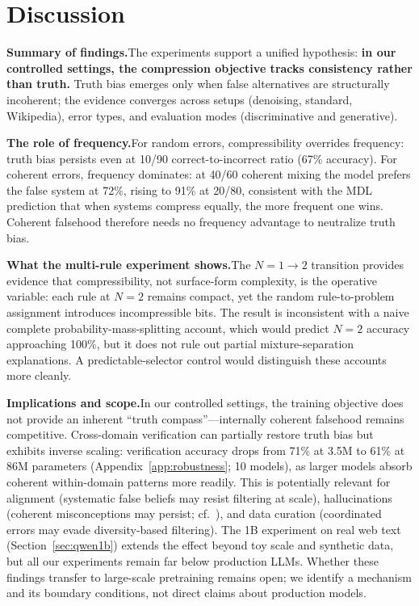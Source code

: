 \documentclass{article}
\begin{document}
\section{Discussion}
\label{sec:discussion}

\textbf{Summary of findings.}\quad The experiments support a unified hypothesis: \textbf{in our controlled settings, the compression objective tracks consistency rather than truth.} Truth bias emerges only when false alternatives are structurally incoherent; the evidence converges across setups (denoising, standard, Wikipedia), error types, and evaluation modes (discriminative and generative).

\textbf{The role of frequency.}\quad For random errors, compressibility overrides frequency: truth bias persists even at 10/90 correct-to-incorrect ratio (67\% accuracy). For coherent errors, frequency dominates: at 40/60 coherent mixing the model prefers the false system at 72\%, rising to 91\% at 20/80, consistent with the MDL prediction that when systems compress equally, the more frequent one wins. Coherent falsehood therefore needs no frequency advantage to neutralize truth bias.

\textbf{What the multi-rule experiment shows.}\quad The $N{=}1 \to 2$ transition provides evidence that compressibility, not surface-form complexity, is the operative variable: each rule at $N{=}2$ remains compact, yet the random rule-to-problem assignment introduces incompressible bits. The result is inconsistent with a naive complete probability-mass-splitting account, which would predict $N{=}2$ accuracy approaching 100\%, but it does not rule out partial mixture-separation explanations. A predictable-selector control would distinguish these accounts more cleanly.

\textbf{Implications and scope.}\quad In our controlled settings, the training objective does not provide an inherent ``truth compass''---internally coherent falsehood remains competitive. Cross-domain verification can partially restore truth bias but exhibits inverse scaling: verification accuracy drops from 71\% at 3.5M to 61\% at 86M parameters (Appendix~\ref{app:robustness}; 10 models), as larger models absorb coherent within-domain patterns more readily. This is potentially relevant for alignment (systematic false beliefs may resist filtering at scale), hallucinations (coherent misconceptions may persist; cf.\ \citealp{kalai2024calibrated}), and data curation (coordinated errors may evade diversity-based filtering). The 1B experiment on real web text (Section~\ref{sec:qwen1b}) extends the effect beyond toy scale and synthetic data, but all our experiments remain far below production LLMs. Whether these findings transfer to large-scale pretraining remains open; we identify a mechanism and its boundary conditions, not direct claims about production models.
\end{document}
